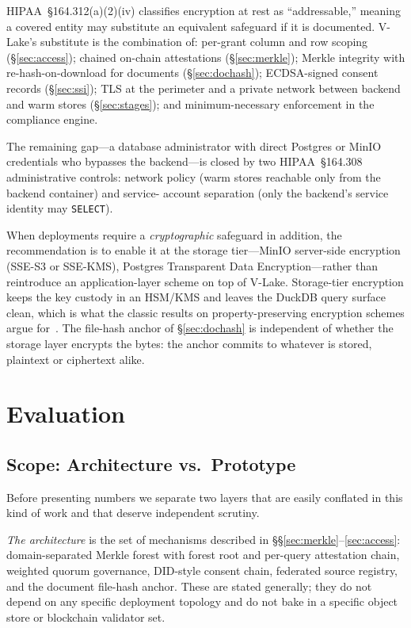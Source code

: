 \documentclass[10pt,twocolumn]{article}
\begin{document}
HIPAA~\S164.312(a)(2)(iv) classifies encryption at rest as
``addressable,'' meaning a covered entity may substitute an
equivalent safeguard if it is documented. V-Lake's substitute is
the combination of: per-grant column and row scoping
(\S\ref{sec:access}); chained on-chain attestations
(\S\ref{sec:merkle}); Merkle integrity with re-hash-on-download
for documents (\S\ref{sec:dochash}); ECDSA-signed consent records
(\S\ref{sec:ssi}); TLS at the perimeter and a private network
between backend and warm stores (\S\ref{sec:stages}); and
minimum-necessary enforcement in the compliance engine.

The remaining gap---a database administrator with direct Postgres
or MinIO credentials who bypasses the backend---is closed by two
HIPAA~\S164.308 administrative controls: network policy (warm
stores reachable only from the backend container) and service-
account separation (only the backend's service identity may
\texttt{SELECT}).

When deployments require a \emph{cryptographic} safeguard in
addition, the recommendation is to enable it at the storage
tier---MinIO server-side encryption (SSE-S3 or SSE-KMS), Postgres
Transparent Data Encryption---rather than reintroduce an
application-layer scheme on top of V-Lake. Storage-tier
encryption keeps the key custody in an HSM/KMS and leaves the
DuckDB query surface clean, which is what the classic results on
property-preserving encryption schemes argue
for~\cite{naveed2015inference}. The file-hash anchor of
\S\ref{sec:dochash} is independent of whether the storage layer
encrypts the bytes: the anchor commits to whatever is stored,
plaintext or ciphertext alike.


\section{Evaluation}
\label{sec:eval}

\subsection{Scope: Architecture vs.\ Prototype}
\label{sec:arch-vs-prototype}

Before presenting numbers we separate two layers that are easily
conflated in this kind of work and that deserve independent
scrutiny.

\emph{The architecture} is the set of mechanisms described in
\S\S\ref{sec:merkle}--\ref{sec:access}: domain-separated Merkle
forest with forest root and per-query attestation chain, weighted
quorum governance, DID-style consent chain, federated source
registry, and the document file-hash anchor. These are stated
generally; they do not depend on any specific deployment
topology and do not bake in a specific object store or
blockchain validator set.
\end{document}
